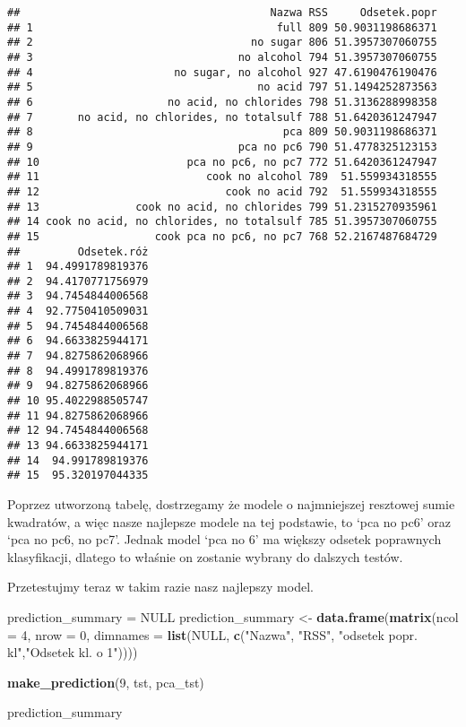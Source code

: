 \documentclass[
]{article}
\newenvironment{Shaded}{\begin{snugshade}}{\end{snugshade}}
\newcommand{\AttributeTok}[1]{\textcolor[rgb]{0.13,0.29,0.53}{#1}}
\newcommand{\ConstantTok}[1]{\textcolor[rgb]{0.56,0.35,0.01}{#1}}
\newcommand{\DecValTok}[1]{\textcolor[rgb]{0.00,0.00,0.81}{#1}}
\newcommand{\FunctionTok}[1]{\textcolor[rgb]{0.13,0.29,0.53}{\textbf{#1}}}
\newcommand{\NormalTok}[1]{#1}
\newcommand{\OtherTok}[1]{\textcolor[rgb]{0.56,0.35,0.01}{#1}}
\newcommand{\StringTok}[1]{\textcolor[rgb]{0.31,0.60,0.02}{#1}}
\begin{document}
\begin{verbatim}
##                                       Nazwa RSS     Odsetek.popr
## 1                                      full 809 50.9031198686371
## 2                                  no sugar 806 51.3957307060755
## 3                                no alcohol 794 51.3957307060755
## 4                      no sugar, no alcohol 927 47.6190476190476
## 5                                   no acid 797 51.1494252873563
## 6                     no acid, no chlorides 798 51.3136288998358
## 7       no acid, no chlorides, no totalsulf 788 51.6420361247947
## 8                                       pca 809 50.9031198686371
## 9                                pca no pc6 790 51.4778325123153
## 10                       pca no pc6, no pc7 772 51.6420361247947
## 11                          cook no alcohol 789  51.559934318555
## 12                             cook no acid 792  51.559934318555
## 13               cook no acid, no chlorides 799 51.2315270935961
## 14 cook no acid, no chlorides, no totalsulf 785 51.3957307060755
## 15                  cook pca no pc6, no pc7 768 52.2167487684729
##         Odsetek.róż
## 1  94.4991789819376
## 2  94.4170771756979
## 3  94.7454844006568
## 4  92.7750410509031
## 5  94.7454844006568
## 6  94.6633825944171
## 7  94.8275862068966
## 8  94.4991789819376
## 9  94.8275862068966
## 10 95.4022988505747
## 11 94.8275862068966
## 12 94.7454844006568
## 13 94.6633825944171
## 14  94.991789819376
## 15  95.320197044335
\end{verbatim}

Poprzez utworzoną tabelę, dostrzegamy że modele o najmniejszej resztowej
sumie kwadratów, a więc nasze najlepsze modele na tej podstawie, to `pca
no pc6' oraz `pca no pc6, no pc7'. Jednak model `pca no 6' ma większy
odsetek poprawnych klasyfikacji, dlatego to właśnie on zostanie wybrany
do dalszych testów.

Przetestujmy teraz w takim razie nasz najlepszy model.

\begin{Shaded}
\begin{Highlighting}[]
\NormalTok{prediction\_summary }\OtherTok{=} \ConstantTok{NULL}
\NormalTok{prediction\_summary }\OtherTok{\textless{}{-}} \FunctionTok{data.frame}\NormalTok{(}\FunctionTok{matrix}\NormalTok{(}\AttributeTok{ncol =} \DecValTok{4}\NormalTok{, }\AttributeTok{nrow =} \DecValTok{0}\NormalTok{, }\AttributeTok{dimnames =} \FunctionTok{list}\NormalTok{(}\ConstantTok{NULL}\NormalTok{, }\FunctionTok{c}\NormalTok{(}\StringTok{"Nazwa"}\NormalTok{, }\StringTok{"RSS"}\NormalTok{, }\StringTok{"odsetek popr. kl"}\NormalTok{,}\StringTok{"Odsetek kl. o 1"}\NormalTok{))))}

\FunctionTok{make\_prediction}\NormalTok{(}\DecValTok{9}\NormalTok{, tst, pca\_tst)}

\NormalTok{prediction\_summary}
\end{Highlighting}
\end{Shaded}
\end{document}
